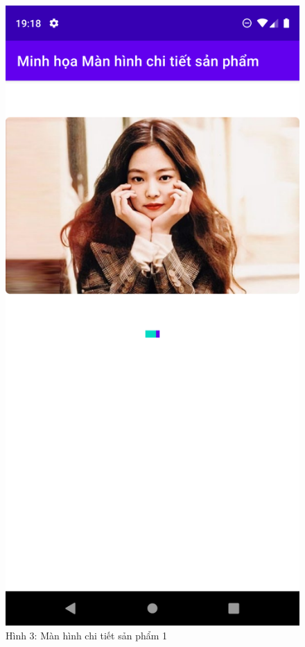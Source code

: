 \documentclass{beamer}
\begin{document}
\begin{frame}
    \begin{columns}
        \begin{figure}
            \centering
            \includegraphics[height=0.7\textheight]{images/37.png}
            \caption{\centering\tiny{Hình 3: Màn hình chi tiết sản phẩm 1}}


\end{figure}
\end{columns}
\end{frame}
\end{document}
